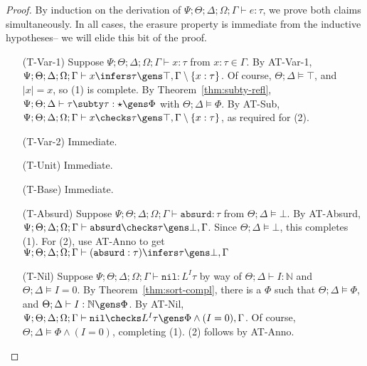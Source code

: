 \begin{proof}
By induction on the derivation of $\Psi;\Theta;\Delta;\Omega;\Gamma \vdash e : \tau$, we prove both claims simultaneously.
In all cases, the erasure property is immediate from the inductive hypotheses-- we will elide this bit of the proof.
\begin{itemize}
  \item[(T-Var-1)] Suppose $\Psi ; \Theta ; \Delta ; \Omega ; \Gamma \vdash x : \tau$ from $x : \tau \in \Gamma$. By AT-Var-1, $\Psi ; \Theta ; \Delta ; \Omega ; \Gamma \vdash x \infers \tau \gens \top,\Gamma \setminus \{x : \tau\}$. Of course, $\Theta ; \Delta \vDash \top$, and $|x| = x$, so (1) is complete. By Theorem~\ref{thm:subty-refl}, $\Psi ; \Theta ; \Delta \vdash \tau \subty \tau : \star \gens \Phi$ with $\Theta ; \Delta \vDash \Phi$. By AT-Sub,  $\Psi ; \Theta ; \Delta ; \Omega ; \Gamma \vdash x \checks \tau \gens \top,\Gamma \setminus \{x : \tau\}$, as required for (2).
  
  \item[(T-Var-2)] Immediate.
  \item[(T-Unit)] Immediate.
  \item[(T-Base)] Immediate.
  \item[(T-Absurd)] Suppose $\Psi ; \Theta ; \Delta ; \Omega ; \Gamma \vdash \texttt{absurd} : \tau$ from $\Theta ; \Delta \vDash \bot$. By AT-Absurd,
  $\Psi ; \Theta ; \Delta ; \Omega ; \Gamma \vdash \texttt{absurd} \checks \tau \gens \bot,\Gamma$. Since $\Theta ; \Delta \vDash \bot$, this completes (1). For (2),
  use AT-Anno to get $\Psi ; \Theta ; \Delta ; \Omega ; \Gamma \vdash (\texttt{absurd} : \tau) \infers \tau \gens \bot,\Gamma$
  
  \item[(T-Nil)] Suppose $\Psi ; \Theta ; \Delta ; \Omega ; \Gamma\vdash \texttt{nil} : L^I \tau$ by way of
  $\Theta ; \Delta \vdash I : \mathbb{N}$ and
  $\Theta;\Delta \vDash I = 0$.
  By Theorem~\ref{thm:sort-compl}, there is a $\Phi$ such that
  $\Theta ; \Delta \vDash \Phi$, and
  $\Theta ; \Delta \vdash I : \mathbb{N} \gens \Phi$.
  By AT-Nil, $\Psi ; \Theta ; \Delta ; \Omega ; \Gamma\vdash \texttt{nil} \checks L^I \tau \gens \Phi \wedge (I = 0),\Gamma$.
  Of course, $\Theta ; \Delta \vDash \Phi \wedge (I = 0)$,
  completing (1). (2) follows by AT-Anno.
  

\end{itemize}
\end{proof}
